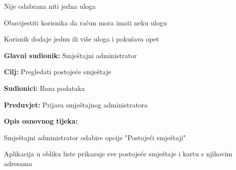 \begin{packed_item}
\begin{packed_item}
\begin{packed_enum}
						\end{packed_enum}
						\item[2.c] Nije odabrana niti jedna uloga
						\item[] \begin{packed_enum}
							
							\item Obavijestiti korisnika da račun mora imati neku ulogu
							\item Korisnik dodaje jednu ili više uloga i pokušava opet
							
						\end{packed_enum}
						
					\end{packed_item}
				\end{packed_item}
				
				\noindent {}
				\begin{packed_item}
					
					\item \textbf{Glavni sudionik: }Smještajni administrator
					\item  \textbf{Cilj:} Pregledati postojeće smještaje
					\item  \textbf{Sudionici:} Baza podataka
					\item  \textbf{Preduvjet:} Prijava smještajnog administratora
					\item  \textbf{Opis osnovnog tijeka:}
					
					\item[] \begin{packed_enum}
						
						\item Smještajni administrator odabire opcije "Postojeći smještaji"
						\item Aplikacija u obliku liste prikazuje sve postojeće smještaje i kartu s njihovim adresama
					\end{packed_enum}

				\end{packed_item}
				
